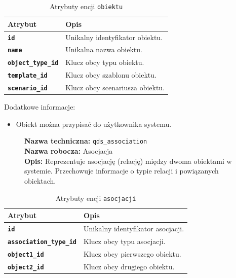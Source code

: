 \begin{table}[H]
    \centering
    \renewcommand{\arraystretch}{1.6}
    \begin{tabular}{|>{\bfseries}l|p{}|}
        \hline
        \rowcolor[HTML]{EFEFEF} \textbf{Atrybut} & \textbf{Opis} \\
        \hline
        \texttt{id} & Unikalny identyfikator obiektu. \\
        \hline
        \texttt{name} & Unikalna nazwa obiektu. \\
        \hline
        \texttt{object\_type\_id} & Klucz obcy typu obiektu. \\
        \hline
        \texttt{template\_id} & Klucz obcy szablonu obiektu. \\
        \hline
        \texttt{scenario\_id} & Klucz obcy scenariusza obiektu. \\
        \hline
    \end{tabular}
    \caption{Atrybuty encji \texttt{obiektu}}
\end{table}

Dodatkowe informacje:
\begin{itemize}
    \item Obiekt można przypisać do użytkownika systemu.
\end{itemize}

\begin{figure}[H]
    \centering
    \begin{minipage}{0.8\textwidth}
        \begin{framed}
            \noindent\textbf{\large Nazwa techniczna:} \texttt{qds\_association} \\
            \textbf{\large Nazwa robocza:} Asocjacja \\
            \textbf{\large Opis:} Reprezentuje asocjację (relację) między dwoma obiektami w systemie.
            Przechowuje informacje o typie relacji i powiązanych obiektach.
        \end{framed}
    \end{minipage}
\end{figure}

\begin{table}[H]
    \centering
    \renewcommand{\arraystretch}{1.6}
    \begin{tabular}{|>{\bfseries}l|p{}|}
        \hline
        \rowcolor[HTML]{EFEFEF} \textbf{Atrybut} & \textbf{Opis} \\
        \hline
        \texttt{id} & Unikalny identyfikator asocjacji. \\
        \hline
        \texttt{association\_type\_id} & Klucz obcy typu asocjacji. \\
        \hline
        \texttt{object1\_id} & Klucz obcy pierwszego obiektu. \\
        \hline
        \texttt{object2\_id} & Klucz obcy drugiego obiektu. \\
        \hline
    \end{tabular}
    \caption{Atrybuty encji \texttt{asocjacji}}
\end{table}

